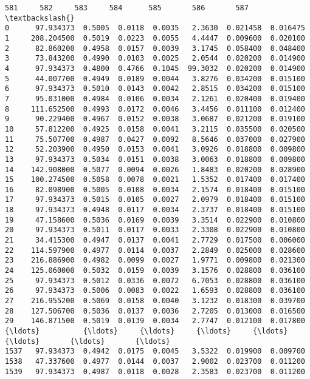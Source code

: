 \documentclass[11pt]{article}
\begin{document}
\begin{Verbatim}[commandchars=\\\{\}]
             581     582     583     584      585       586       587  \textbackslash{}
0      97.934373  0.5005  0.0118  0.0035   2.3630  0.021458  0.016475   
1     208.204500  0.5019  0.0223  0.0055   4.4447  0.009600  0.020100   
2      82.860200  0.4958  0.0157  0.0039   3.1745  0.058400  0.048400   
3      73.843200  0.4990  0.0103  0.0025   2.0544  0.020200  0.014900   
4      97.934373  0.4800  0.4766  0.1045  99.3032  0.020200  0.014900   
5      44.007700  0.4949  0.0189  0.0044   3.8276  0.034200  0.015100   
6      97.934373  0.5010  0.0143  0.0042   2.8515  0.034200  0.015100   
7      95.031000  0.4984  0.0106  0.0034   2.1261  0.020400  0.019400   
8     111.652500  0.4993  0.0172  0.0046   3.4456  0.011100  0.012400   
9      90.229400  0.4967  0.0152  0.0038   3.0687  0.021200  0.019100   
10     57.812200  0.4925  0.0158  0.0041   3.2115  0.035500  0.020500   
11     75.507700  0.4987  0.0427  0.0092   8.5646  0.037000  0.027900   
12     52.203900  0.4950  0.0153  0.0041   3.0926  0.018800  0.009800   
13     97.934373  0.5034  0.0151  0.0038   3.0063  0.018800  0.009800   
14    142.908000  0.5077  0.0094  0.0026   1.8483  0.020200  0.028900   
15    100.274500  0.5058  0.0078  0.0021   1.5352  0.017400  0.017400   
16     82.098900  0.5005  0.0108  0.0034   2.1574  0.018400  0.015100   
17     97.934373  0.5015  0.0105  0.0027   2.0979  0.018400  0.015100   
18     97.934373  0.4948  0.0117  0.0034   2.3737  0.018400  0.015100   
19     47.158600  0.5036  0.0169  0.0039   3.3514  0.022900  0.010800   
20     97.934373  0.5011  0.0117  0.0033   2.3308  0.022900  0.010800   
21     34.415300  0.4947  0.0137  0.0041   2.7729  0.017500  0.006000   
22    114.597900  0.4977  0.0114  0.0037   2.2849  0.025000  0.028600   
23    216.886900  0.4982  0.0099  0.0027   1.9771  0.009800  0.021300   
24    125.060000  0.5032  0.0159  0.0039   3.1576  0.028800  0.036100   
25     97.934373  0.5012  0.0336  0.0072   6.7053  0.028800  0.036100   
26     97.934373  0.5006  0.0083  0.0022   1.6593  0.028800  0.036100   
27    216.955200  0.5069  0.0158  0.0040   3.1232  0.018300  0.039700   
28    127.506700  0.5036  0.0137  0.0036   2.7205  0.013000  0.016500   
29    146.871500  0.5019  0.0139  0.0034   2.7747  0.012100  0.017800   
{\ldots}          {\ldots}     {\ldots}     {\ldots}     {\ldots}      {\ldots}       {\ldots}       {\ldots}   
1537   97.934373  0.4942  0.0175  0.0045   3.5322  0.019900  0.009700   
1538   47.337600  0.4977  0.0144  0.0037   2.9002  0.023700  0.011200   
1539   97.934373  0.4987  0.0118  0.0028   2.3583  0.023700  0.011200   

\end{Verbatim}
\end{document}
